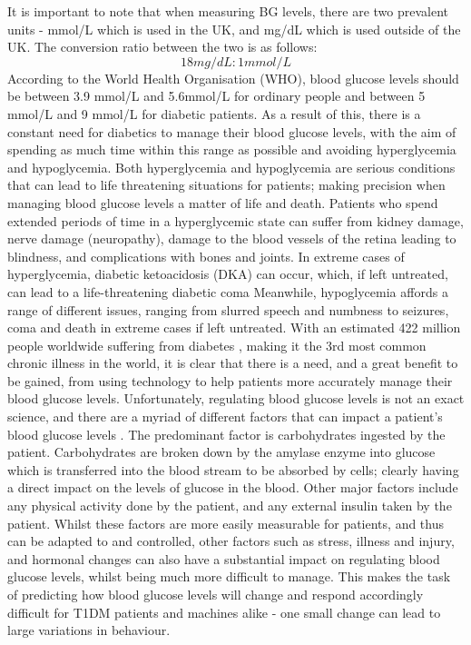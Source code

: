     It is important to note that when measuring BG levels, there are two prevalent units - mmol/L which is used in the UK, and mg/dL which is used outside of the UK. The conversion ratio between the two is as follows: \[18mg/dL : 1mmol/L\] According to the World Health Organisation (WHO), blood glucose levels should be between 3.9 mmol/L and 5.6mmol/L \cite{WHOBGL} for ordinary people and between 5 mmol/L and 9 mmol/L for diabetic patients.   As a result of this, there is a constant need for diabetics to manage their blood glucose levels, with the aim of spending as much time within this range as possible and avoiding hyperglycemia and hypoglycemia. Both hyperglycemia and hypoglycemia are serious conditions that can lead to life threatening situations for patients; making precision when managing blood glucose levels a matter of life and death. Patients who spend extended periods of time in a hyperglycemic state can suffer from kidney damage, nerve damage (neuropathy), damage to the blood vessels of the retina leading to blindness, and complications with bones and joints. In extreme cases of hyperglycemia, diabetic ketoacidosis (DKA) can occur, which, if left untreated, can lead to a life-threatening diabetic coma \cite{mayohyper} Meanwhile, hypoglycemia affords a range of different issues, ranging from slurred speech and numbness to seizures, coma and death in extreme cases if left untreated\cite{adahypo}. 
    \newline
    With an estimated 422 million people worldwide suffering from diabetes \cite{world_2019}, making it the 3rd most common chronic illness in the world, it is clear that there is a need, and a great benefit to be gained, from using technology to help patients more accurately manage their blood glucose levels. Unfortunately, regulating blood glucose levels is not an exact science, and there are a myriad of different factors that can impact a patient's blood glucose levels \cite{bglfactors}. The predominant factor is carbohydrates ingested by the patient. Carbohydrates are broken down by the amylase enzyme into glucose which is transferred into the blood stream to be absorbed by cells; clearly having a direct impact on the levels of glucose in the blood. Other major factors include any physical activity done by the patient, and any external insulin taken by the patient. Whilst these factors are more easily measurable for patients, and thus can be adapted to and controlled, other factors such as stress, illness and injury, and hormonal changes can also have a substantial impact on regulating blood glucose levels, whilst being much more difficult to manage. This makes the task of predicting how blood glucose levels will change and respond accordingly difficult for T1DM patients and machines alike - one small change can lead to large variations in behaviour.  

